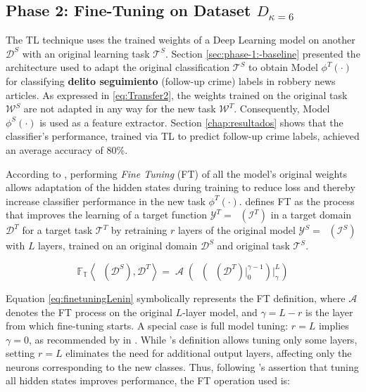 \documentclass[onecolumn, journal, english, 12pt, a4paper]{IEEEtran} %
\DeclareMathOperator{\ypredtarget}{\phi^{T}}
\DeclareMathOperator{\ypredsource}{\phi^{S}}
\DeclareMathOperator{\ConvNetOut}{\mathcal{A}}
\theoremstyle{definition}
\begin{document}
\subsection{Phase 2: Fine-Tuning on Dataset $D_{\kappa=6}$}
\label{sec:phase-2:-finetuningBert}
The TL technique uses the trained weights of a Deep Learning model on
another $\mathcal{D}^{S}$ with an original learning task
$\mathcal{T}^{S}$. Section \ref{sec:phase-1:-baseline} presented the
architecture used to adapt the original classification
$\mathcal{T}^{S}$ to obtain Model $\phi^T(\cdot)$ for classifying
\textbf{delito seguimiento} (follow-up crime) labels in robbery news
articles. As expressed in \eqref{eq:Transfer2}, the weights trained on
the original task $\mathcal{W}^S$ are not adapted in any way for the
new task $\mathcal{W}^T$. Consequently, Model $\phi^S(\cdot)$ is used
as a feature extractor. Section \ref{chap:resultados} shows that the
classifier's performance, trained via TL to predict follow-up crime
labels, achieved an average accuracy of 80\%.

According to \textcite{tunstall2022natural},
performing \emph{Fine Tuning} (FT) of all the model's original weights
allows adaptation of the hidden states during training to reduce loss
and thereby increase classifier performance in the new task
$\phi^T(\cdot)$. \textcite{falconi2020transfer} defines FT as the
process that improves the learning of a target function
$\mathcal{Y}^T = \ypredtarget(\mathcal{I}^T)$ in a target domain
$\mathcal{D}^T$ for a target task $\mathcal{T}^T$ by retraining $r$
layers of the original model
$\mathcal{Y}^S = \ypredsource(\mathcal{I}^S)$ with $L$ layers, trained
on an original domain $\mathcal{D}^S$ and original task
$\mathcal{T}^S$.

\begin{equation}
    \mathbb{F_{T}} \left< \ypredsource(\mathcal{D}^{S}), \mathcal{D}^{T} \right> = \ConvNetOut \left( \ypredsource \left (\ypredsource(\mathcal{D}^{T}) \Bigr\rvert_{0}^{\gamma -1} \right)\Bigr\rvert_{\gamma}^{L}\right) 
    \label{eq:finetuningLenin}
\end{equation}

Equation \eqref{eq:finetuningLenin} symbolically represents the FT
definition, where $\mathcal{A}$ denotes the FT process on the original
$L$-layer model, and $\gamma = L-r$ is the layer from which
fine-tuning starts. A special case is full model tuning: $r=L$ implies
$\gamma=0$, as recommended by \citeauthor{tunstall2022natural} in
. While
\textcite{falconi2020transfer}'s definition allows tuning only some
layers, setting $r=L$ eliminates the need for additional output
layers, affecting only the neurons corresponding to the new
classes. Thus, following \textcite{tunstall2022natural}'s assertion
that tuning all hidden states improves performance, the FT operation
used is:
\end{document}
